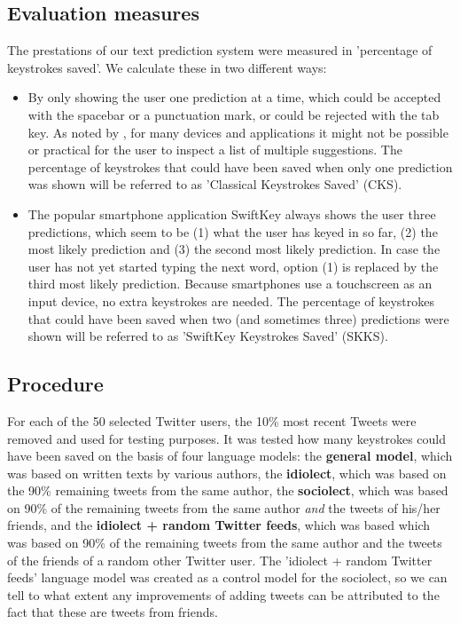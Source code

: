 \documentclass[11pt]{article}
\begin{document}
\subsection{Evaluation measures}
The prestations of our text prediction system were measured in 'percentage of keystrokes saved'. We calculate these in two different ways:
\begin{itemize}
\item By only showing the user one prediction at a time, which could be accepted with the spacebar or a punctuation mark, or could be rejected with the tab key. As noted by , for many devices and applications it might not be possible or practical for the user to inspect a list of multiple suggestions. The percentage of keystrokes that could have been saved when only one prediction was shown will be referred to as 'Classical Keystrokes Saved' (CKS).
\item The popular smartphone application SwiftKey always shows the user three predictions, which seem to be (1) what the user has keyed in so far, (2) the most likely prediction and (3) the second most likely prediction. In case the user has not yet started typing the next word, option (1) is replaced by the third most likely prediction. Because smartphones use a touchscreen as an input device, no extra keystrokes are needed. The percentage of keystrokes that could have been saved when two (and sometimes three) predictions were shown will be referred to as 'SwiftKey Keystrokes Saved' (SKKS).
\end{itemize}

\subsection{Procedure}
For each of the 50 selected Twitter users, the 10\% most recent Tweets were removed and used for testing purposes. It was tested how many keystrokes could have been saved on the basis of four language models: the \textbf{general model}, which was based on written texts by various authors, the \textbf{idiolect}, which was based on the 90\% remaining tweets from the same author, the \textbf{sociolect}, which was based on 90\% of the remaining tweets from the same author \emph{and} the tweets of his/her friends, and the \textbf{idiolect + random Twitter feeds}, which was based which was based on 90\% of the remaining tweets from the same author and the tweets of the friends of a random other Twitter user. The 'idiolect + random Twitter feeds' language model was created as a control model for the sociolect, so we can tell to what extent any improvements of adding tweets can be attributed to the fact that these are tweets from friends.
\end{document}
